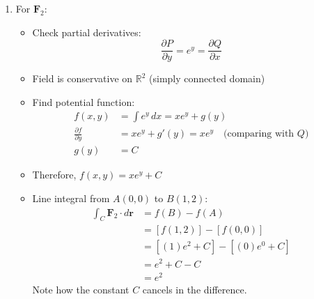 \begin{example}
\begin{solution}
\begin{enumerate}
    \item For $\mathbf{F}_2$:
    \begin{itemize}
        \item Check partial derivatives:
        \[
        \frac{\partial P}{\partial y} = e^y = \frac{\partial Q}{\partial x}
        \]
        \item Field is conservative on $\mathbb{R}^2$ (simply connected domain)
        \item Find potential function:
        \begin{align*}
        f(x,y) &= \int e^y\,dx = xe^y + g(y) \\
        \frac{\partial f}{\partial y} &= xe^y + g'(y) = xe^y \quad \text{(comparing with $Q$)} \\
        g(y) &= C
        \end{align*}
        \item Therefore, $f(x,y) = xe^y + C$
        \item Line integral from $A(0,0)$ to $B(1,2)$:
        \begin{align*}
        \int_C \mathbf{F}_2\cdot d\mathbf{r} &= f(B) - f(A) \\
        &= [f(1,2)] - [f(0,0)] \\
        &= [(1)e^2 + C] - [(0)e^0 + C] \\
        &= e^2 + C - C \\
        &= e^2
        \end{align*}
        Note how the constant $C$ cancels in the difference.
    \end{itemize}



\end{enumerate}
\end{solution}
\end{example}
